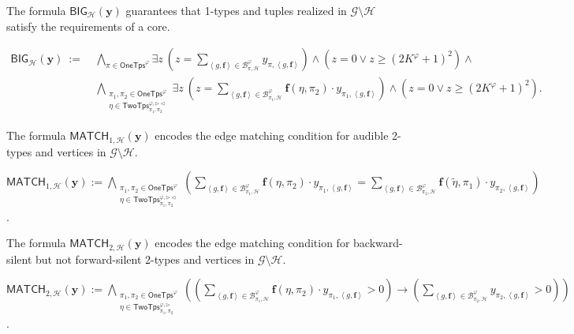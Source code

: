 \documentclass[10pt,a4paper]{article}
\theoremstyle{definition}
\theoremstyle{remark}
\newcommand{\cB}{\mathcal{B}}
\newcommand{\cG}{\mathcal{G}}
\newcommand{\cH}{\mathcal{H}}
\newcommand{\cK}{\mathsf{TwoTps}}
\newcommand{\bff}{\mathbf{f}}
\newcommand{\bfy}{\mathbf{y}}
\newcommand{\onetypes}{\mathsf{OneTps}}
\newcommand{\tuple}[1]       {\left\langle #1 \right\rangle}
\newcommand{\dual}[1] {\widetilde{ #1 }}
\newcommand{\trif} {\triangleright}
\newcommand{\trib} {\triangleleft}
\newcommand{\cKvpf}     {\cK^{\varphi, \trif}}
\newcommand{\cKvpfb}    {\cK^{\varphi, \trif\trib}}
\newcommand{\bige}  {\mathsf{BIG}}
\newcommand{\match} {\mathsf{MATCH}}
\begin{document}
\begin{compactitem}
    \item
    The formula $\bige_{\cH}(\bfy)$ guarantees that 1-types and tuples realized in $\cG \setminus \cH$ satisfy the requirements of a core. \\
    \begin{notsotiny}
    $
    \begin{aligned}
        \bige_{\cH}(\bfy)
        \ :=\ &
        \bigwedge_{\pi \in \onetypes^\varphi}
            \exists z\ 
            \left(
                z = \sum_{\tuple{g, \bff} \in \cB^\varphi_{\pi, \cH}} y_{\pi, \tuple{g, \bff}}
            \right) \land
            \left(
                z = 0  \lor
                z \ge (2K^\varphi+1)^2 
            \right)
        \land \\
        &\bigwedge_{\substack{
            \pi_1, \pi_2 \in \onetypes^\varphi \\ 
            \eta \in \cKvpfb_{\pi_1, \pi_2}}}
        \exists z\ 
        \left(z = \sum_{\tuple{g, \bff} \in \cB^\varphi_{\pi_1, \cH}} \bff(\eta, \pi_2) \cdot y_{\pi_1, \tuple{g, \bff}}\right) \land
        \left(
            z = 0 \lor
            z \ge (2K^\varphi+1)^2
            \right).
        \end{aligned}
    $
    \end{notsotiny}
    \item
        The formula $\match_{1, \cH}(\bfy)$ encodes the edge matching condition for audible 2-types and vertices in $\cG \setminus \cH$. \\
        \begin{notsotiny}
        $\displaystyle
        \match_{1, \cH}(\bfy)
         := 
        \bigwedge_{\substack{
            \pi_1, \pi_2 \in \onetypes^\varphi \\
            \eta \in \cKvpfb_{\pi_1, \pi_2}}}
        \left(
            \sum_{\tuple{g, \bff} \in \cB^{\varphi}_{\pi_1, \cH}} \bff(\eta, \pi_2) \cdot y_{\pi_1, \tuple{g, \bff}}
            =
            \sum_{\tuple{g, \bff} \in \cB^{\varphi}_{\pi_2, \cH}} \bff(\dual{\eta}, \pi_1) \cdot y_{\pi_2, \tuple{g, \bff}}
        \right)
        $.
        \end{notsotiny}

    \item
        The formula $\match_{2, \cH}(\bfy)$ encodes the edge matching condition for backward-silent but not forward-silent 2-types and vertices in $\cG \setminus \cH$. \\
        \begin{notsotiny}
        $\displaystyle
        \match_{2, \cH}(\bfy)
         := 
        \bigwedge_{\substack{
            \pi_1, \pi_2 \in \onetypes^\varphi \\
            \eta \in \cKvpf_{\pi_1, \pi_2}}}
        \left(
            \left(
                \sum_{\tuple{g, \bff} \in \cB^{\varphi}_{\pi_1, \cH}} \bff(\eta, \pi_2) \cdot y_{\pi_1, \tuple{g, \bff}} > 0
            \right)
            \to
            \left(
                \sum_{\tuple{g, \bff} \in \cB^{\varphi}_{\pi_2, \cH}} y_{\pi_2, \tuple{g, \bff}} > 0
            \right)
        \right)
        $.
        \end{notsotiny}
        

\end{compactitem}
\end{document}
